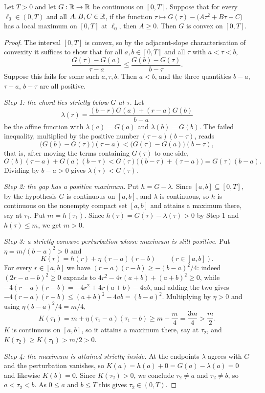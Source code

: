 \begin{lemma}
Let $T>0$ and let $G:\mathbb{R}\to\mathbb{R}$ be continuous on $[0,T]$. Suppose that for every
$\ell_0\in(0,T)$ and all $A,B,C\in\mathbb{R}$, if the function
$\tau\mapsto G(\tau)-\bigl(A\tau^2+B\tau+C\bigr)$ has a local maximum on $[0,T]$ at
$\ell_0$, then $A\ge0$. Then $G$ is convex on $[0,T]$.
\end{lemma}
\begin{proof}
The interval $[0,T]$ is convex, so by the adjacent-slope characterisation of convexity it
suffices to show that for all $a,b\in[0,T]$ and all $\tau$ with $a<\tau<b$,
\[
  \frac{G(\tau)-G(a)}{\tau-a}\le\frac{G(b)-G(\tau)}{b-\tau}.
\]
Suppose this fails for some such $a,\tau,b$. Then $a<b$, and the three quantities
$b-a$, $\tau-a$, $b-\tau$ are all positive.

\emph{Step 1: the chord lies strictly below $G$ at $\tau$.}
Let
\[
  \lambda(r)=\frac{(b-r)G(a)+(r-a)G(b)}{b-a}
\]
be the affine function with $\lambda(a)=G(a)$ and $\lambda(b)=G(b)$. The failed
inequality, multiplied by the positive number $(\tau-a)(b-\tau)$, reads
\[
  \bigl(G(b)-G(\tau)\bigr)(\tau-a)<\bigl(G(\tau)-G(a)\bigr)(b-\tau),
\]
that is, after moving the terms containing $G(\tau)$ to one side,
\[
  G(b)(\tau-a)+G(a)(b-\tau)<G(\tau)\bigl((b-\tau)+(\tau-a)\bigr)=G(\tau)(b-a).
\]
Dividing by $b-a>0$ gives $\lambda(\tau)<G(\tau)$.

\emph{Step 2: the gap has a positive maximum.}
Put $h=G-\lambda$. Since $[a,b]\subseteq[0,T]$, by the hypothesis $G$ is continuous on
$[a,b]$, and $\lambda$ is continuous, so $h$ is continuous on the nonempty compact set
$[a,b]$ and attains a maximum there, say at $\tau_1$. Put $m=h(\tau_1)$. Since
$h(\tau)=G(\tau)-\lambda(\tau)>0$ by Step 1 and $h(\tau)\le m$, we get $m>0$.

\emph{Step 3: a strictly concave perturbation whose maximum is still positive.}
Put $\eta=m/(b-a)^2>0$ and
\[
  K(r)=h(r)+\eta\,(r-a)(r-b)\qquad(r\in[a,b]).
\]
For every $r\in[a,b]$ we have $(r-a)(r-b)\ge-(b-a)^2/4$: indeed
$(2r-a-b)^2\ge0$ expands to $4r^2-4r(a+b)+(a+b)^2\ge0$, while
$-4(r-a)(r-b)=-4r^2+4r(a+b)-4ab$, and adding the two gives
$-4(r-a)(r-b)\le(a+b)^2-4ab=(b-a)^2$. Multiplying by $\eta>0$ and using
$\eta(b-a)^2/4=m/4$,
\[
  K(\tau_1)=m+\eta(\tau_1-a)(\tau_1-b)\ge m-\frac m4=\frac{3m}{4}>\frac m2 .
\]
$K$ is continuous on $[a,b]$, so it attains a maximum there, say at $\tau_2$, and
$K(\tau_2)\ge K(\tau_1)>m/2>0$.

\emph{Step 4: the maximum is attained strictly inside.}
At the endpoints $\lambda$ agrees with $G$ and the perturbation vanishes, so
$K(a)=h(a)+0=G(a)-\lambda(a)=0$ and likewise $K(b)=0$. Since $K(\tau_2)>0$, we conclude
$\tau_2\ne a$ and $\tau_2\ne b$, so $a<\tau_2<b$. As $0\le a$ and $b\le T$ this gives
$\tau_2\in(0,T)$.


\end{proof}
